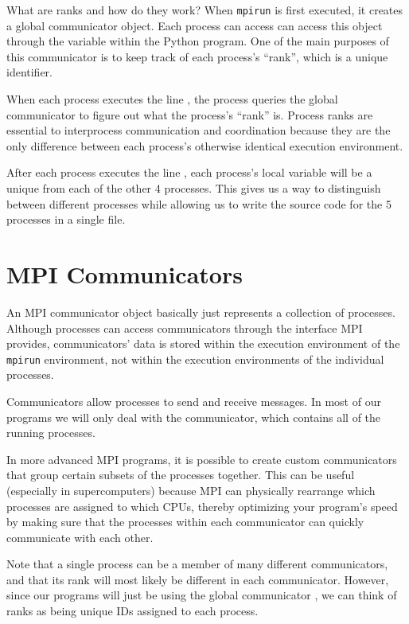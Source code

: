 What are ranks and how do they work? When \texttt{mpirun} is first executed, it creates a global communicator object. Each process can access can access this object through the variable  within the Python program.
One of the main purposes of this communicator is to keep track of each process's ``rank'', which is a unique identifier.

When each process executes the line , the process queries the global communicator to figure out what the process's ``rank'' is.
Process ranks are essential to interprocess communication and coordination because they are the only difference between each process's otherwise identical execution environment.

After each process executes the line , each process's local variable  will be a unique from each of the other 4 processes.
This gives us a way to distinguish between different processes while allowing us to write the source code
for the 5 processes in a single file.

\section*{MPI Communicators}
An MPI communicator object basically just represents a collection of processes.
Although processes can access communicators through the interface MPI provides, communicators' data is stored within the execution environment of the \texttt{mpirun} environment, not within the execution environments of the individual processes.

Communicators allow processes to send and receive messages.
In most of our programs we will only deal with the  communicator, which contains all of the running processes.

\begin{info}
In more advanced MPI programs, it is possible to create custom communicators that group certain subsets of the processes together. This can be useful (especially in supercomputers) because MPI can physically rearrange which processes are assigned to which CPUs, thereby optimizing your program's speed by making sure that the processes within each communicator can quickly communicate with each other.

Note that a single process can be a member of many different communicators, and that its rank will most likely be different in each communicator. However, since our programs will just be using the global communicator , we can think of ranks as being unique IDs assigned to each process.
\end{info}

